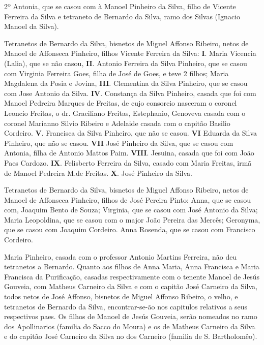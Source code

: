 \hspace{2em}2º Antonia, que se casou com à Manoel Pinheiro da Silva, filho de Vicente Ferreira da Silva e tetraneto de Bernardo da Silva, ramo dos Silvas (Ignacio Manoel da Silva).

Tetranetos de Bernardo da Silva, bisnetos de Miguel Affonso Ribeiro, netos de Manoel de Affonseca Pinheiro, filhos  Vicente Ferreira da Silva: \textbf{I}. Maria Vicencia (Lalia), que se não casou, \textbf{II}. Antonio Ferreira da Silva Pinheiro, que se casou com Virginia Ferreira Goes, filha de José de Goes, e teve 2 filhos; Maria Magdalena da Posia e Jovina, \textbf{III}. Clementina da Silva Pinheiro, que se casou com Jose Antonio da Silva. \textbf{IV}. Constança da Silva Pinheiro, casada que foi com Manoel Pedreira Marques de Freitas, de cujo consorcio nasceram o coronel Leoncio Freitas, o dr. Graciliano Freitas, Estephanio, Genoveva casada com o coronel Marianno Silvio Ribeiro e Adelaide casada com o capitão Basilio Cordeiro. \textbf{V}. Francisca da Silva Pinheiro, que não se casou. \textbf{VI} Eduarda da Silva Pinheiro, que não se casou. \textbf{VII} José Pinheiro da Silva, que se casou com Antonia, filha de Antonio Mattos Paim. \textbf{VIII}. Jesuina, casada que foi com João Paes Cardozo. \textbf{IX}. Felisberto Ferreira da Silva, casado com Maria Freitas, irmã de Manoel Pedreira M.de Freitas. \textbf{X}. José Pinheiro da Silva.

Tetranetos de Bernardo da Silva, bisnetos de Miguel Affonso Ribeiro, netos de Manoel de Affonseca Pinheiro, filhos de José Pereira Pinto: Anna, que se casou com, Joaquim Bento de Souza; Virginia, que se casou com José Antonio da Silva; Maria Leopoldina, que se casou com o major João Pereira das Mercês; Geronyma, que se casou com Joaquim Cordeiro. Anna Rosenda, que se casou com Francisco Cordeiro.

Maria Pinheiro, casada com o professor Antonio Martins Ferreira, não deu tetranetos a Bernardo. Quanto aos filhos de Anna Maria, Anna Francisca e Maria Francisca da Purificação, casadas respectivamente com o tenente Manoel de Jesús Gouveia, com Matheus Carneiro da Silva e com o capitão José Carneiro da Silva, todos netos de José Affonso, bisnetos de Miguel Affonso Ribeiro, o velho, e tetranetos de Bernardo da Silva, encontrar-se-ão nos capitulos relativos a seus respectivos paes. Os filhos de Manoel de Jesús Gouveia, serão nomeados no ramo dos Apollinarios (familia do Sacco do Moura) e os de Matheus Carneiro da Silva e do capitão José Carneiro da Silva no dos Carneiro (familia de S. Bartholomêo).

